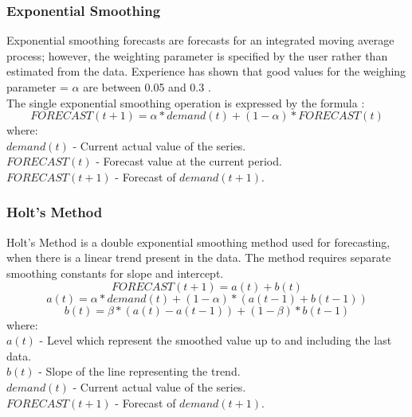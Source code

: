 \subsubsection{Exponential Smoothing}
Exponential smoothing forecasts are forecasts for an integrated moving average process; however, the weighting parameter is specified by the user rather than estimated from the data. Experience has shown that good values for the weighing parameter = $\alpha$ are between 0.05 and 0.3 \cite{SAS}.\\The single exponential smoothing operation is expressed by the formula :
\begin{displaymath}
FORECAST(t+1) = \alpha \ast demand(t) + (1-\alpha) \ast FORECAST(t)		 	 
\end{displaymath}
where:\\ 
$demand(t)$ - Current actual value of the series.\\
$FORECAST(t)$ - Forecast value at the current period.\\
$FORECAST(t+1)$ - Forecast of $demand(t+1)$.

\subsubsection{Holt's Method}
Holt's Method is a double exponential smoothing method used for forecasting, when there is a linear trend present in the data. The method requires separate smoothing constants for slope and intercept.
\begin{displaymath}
FORECAST(t+1) = a(t) + b(t)
\end{displaymath}
\begin{displaymath}
a(t) = \alpha \ast demand(t) +(1-\alpha) \ast (a(t-1) + b(t-1))
\end{displaymath}
\begin{displaymath}
b(t) = \beta \ast (a(t) - a(t-1) ) + (1-\beta) \ast b(t-1)
\end{displaymath}
where:\\
$a(t)$ - Level which represent the smoothed value up to and including the last data.\\
$b(t)$ - Slope of the line representing the trend.\\
$demand(t)$ - Current actual value of the series.\\
$FORECAST(t+1)$ - Forecast of $demand(t+1)$.\\
